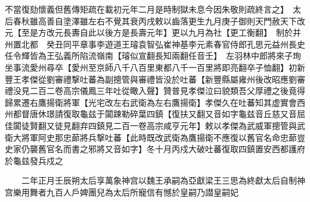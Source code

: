 不當復劾懷義但舊傳矩疏在載初元年二月是時制獄未息今因朱敬則疏終言之】　太后春秋雖高善自塗澤雖左右不覺其衰丙戌敕以齒落更生九月庚子御則天門赦天下改元【至是方改元長夀自此以後方是長壽元年】更以九月為社【更工衡翻】　制於并州置北都　癸丑同平章事李遊道王璿袁智弘崔神基李元素春官侍郎孔思元益州長史任令輝皆為王弘義所陷流嶺南【璿似宣翻長知兩翻任音壬】　左羽林中郎將來子珣坐事流愛州尋卒【愛州至京師八千八百里東都八千一百里將即亮翻卒子恤翻】初新豐王孝傑從劉審禮撃吐蕃為副摠管與審禮皆没於吐蕃【新豐縣屬雍州後改昭應劉審禮没見二百二卷高宗儀鳳三年吐從瞰入聲】贊普見孝傑泣曰貌類吾父厚禮之後竟得歸累遷右鷹揚衛將軍【光宅改左右武衛為左右鷹揚衛】孝傑久在吐蕃知其虚實會西州都督唐休璟請復取龜兹于闐踈勒碎葉四鎮【復扶又翻又音如字龜兹音丘慈又音屈佳闐徒賢翻又徒見翻弃四鎮見二百一卷高宗咸亨元年】敕以孝傑為武威軍摠管與武衛大將軍阿史那忠蓈將兵撃吐蕃【此時既改武衛為鷹揚衛不應復以舊官名命忠蓈豈史家仍襲舊官名而書之邪將又音如字】冬十月丙戍大破吐蕃復取四鎮置安西都護府於龜兹發兵戍之

　　二年正月壬辰朔太后享萬象神宫以魏王承嗣為亞獻梁王三思為終獻太后自制神宫樂用舞者九百人戶婢團兒為太后所寵信有憾於皇嗣乃譛皇嗣妃

